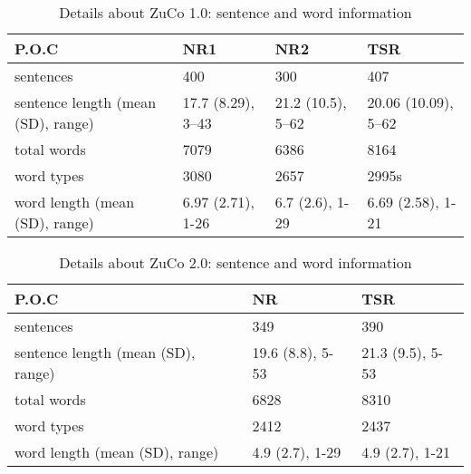 \documentclass[journal]{IEEEtran}
\begin{document}
\begin{table*}[!t]
	\renewcommand{\arraystretch}{1.3}
	\caption{\large  Details about ZuCo 1.0: sentence and word information}
	\label{tab:Details_zuco_1}
	\centering
	\fontsize{12pt}{12pt}\selectfont
	\begin{tabular}{|l|l|l|l|}
		\hline
		P.O.C                              & NR1                 & NR2                 & TSR                    \\ \hline
		sentences                          & 400                 & 300                 & 407                    \\ \hline
		sentence length (mean (SD), range) & 17.7 (8.29), 3–43 & 21.2 (10.5), 5–62 & 20.06  (10.09), 5–62 \\ \hline
		total words                        & 7079                & 6386                & 8164                   \\ \hline
		word types                         & 3080                & 2657                & 2995s                  \\ \hline
		word length (mean (SD), range)     & 6.97 (2.71), 1-26   & 6.7 (2.6), 1-29     & 6.69 (2.58), 1-21      \\ \hline
	\end{tabular}
\end{table*}


\begin{table*}[!t]
	\renewcommand{\arraystretch}{1.3}
	\caption{\large  Details about ZuCo 2.0: sentence and word information}
	\label{tab:Details_zuco_2}
	\centering
	\fontsize{12pt}{12pt}\selectfont
	\begin{tabular}{|l|l|l|}
		\hline
		P.O.C                              & NR               & TSR              \\ \hline
		sentences                          & 349              & 390              \\ \hline
		sentence length (mean (SD), range) & 19.6 (8.8), 5-53 & 21.3 (9.5), 5-53 \\ \hline
		total words                        & 6828             & 8310             \\ \hline
		word types                         & 2412             & 2437             \\ \hline
		word length (mean (SD), range)     & 4.9 (2.7), 1-29  & 4.9 (2.7), 1-21  \\ \hline
	\end{tabular}
\end{table*}
\end{document}
